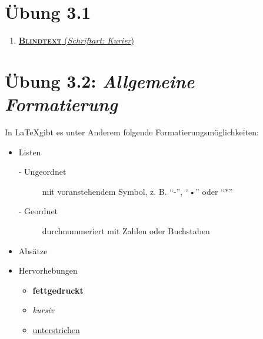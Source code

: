 \documentclass{article}
\begin{document}
\section*{Übung 3.1}

\begin{enumerate}[label=\alph*)]
    \item \underline{
              \textbf{\textsc{Blindtext}}
              (\href{https://tug.org/FontCatalogue/kurier/}{\textit{Schriftart: Kurier}})
          }

          \blindtext[2]
\end{enumerate}

\section*{Übung 3.2:  \emph{\normalsize{Allgemeine Formatierung}}}
In \LaTeX gibt es unter Anderem folgende Formatierungsmöglichkeiten:
\begin{itemize}
    \item Listen
          \begin{description}
              \item [\small{- Ungeordnet}] \tiny{mit voranstehendem Symbol, z. B. \enquote{-}, \enquote{•} oder \enquote{$\ast$}}
              \item [\small{- Geordnet}] \tiny{durchnummeriert mit Zahlen oder Buchstaben}
          \end{description}
    \item Absätze
    \item Hervorhebungen
          \begin{itemize}
              \item \textbf{fettgedruckt}
              \item \textit{kursiv}
              \item \underline{unterstrichen}
          \end{itemize}
\end{itemize}
\end{document}
